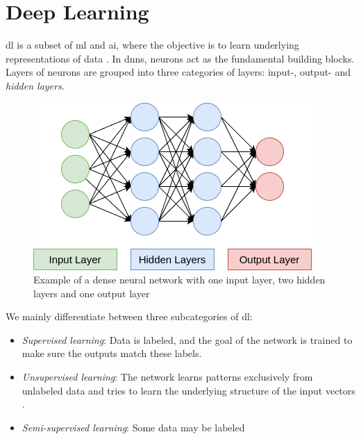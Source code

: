 \section{Deep Learning}

\acrfull{dl} is a subset of \acrshort{ml} and \acrshort{ai}, where the objective is to learn underlying representations of data \cite{lecun2015deep}. In \acrshort{dnn}s, neurons act as the fundamental building blocks. Layers of neurons are grouped into three categories of layers: input-, output- and \textit{hidden layers}.  

\begin{figure}[!h]
    \centering
    \includegraphics[width=0.5\linewidth]{figures/dnn.png}
    \caption{Example of a dense neural network with one input layer, two hidden layers and one output layer}
    \label{fig:densenn}
\end{figure}

We mainly differentiate between three subcategories of \acrshort{dl}:

\begin{itemize}
    \item \textit{Supervised learning}: Data is labeled, and the goal of the network is trained to make sure the outputs match these labels.
    \item \textit{Unsupervised learning}: The network learns patterns exclusively from unlabeled data and tries to learn the underlying structure of the input vectors \cite{KARHUNEN2015125}. 
    \item \textit{Semi-supervised learning}: Some data may be labeled
\end{itemize}





\clearpage

\clearpage

